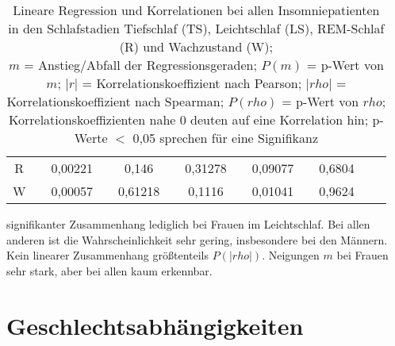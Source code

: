 \begin{table}[H]
\begin{tabularx}{0.85\textwidth}{ccccccccccccc}
R & & 0,00221 & & 0,146 & & 0,31278 & & 0,09077 & & 0,6804\\
W & & 0,00057 & & 0,61218 & & 0,1116 & & 0,01041 & & 0,9624\\
\bottomrule
\end{tabularx}
\caption[Lineare Regression und Korrelationen bei allen Insomniepatienten]{Lineare Regression und Korrelationen bei allen Insomniepatienten in den Schlafstadien Tiefschlaf (TS), Leichtschlaf (LS), \acs{REM}-Schlaf (R) und Wachzustand (W);\\
$m$ = Anstieg/Abfall der Regressionsgeraden; $P(m)$ = p-Wert von $m$; $|r|$ = Korrelationskoeffizient nach Pearson; $|rho|$ = Korrelationskoeffizient nach Spearman; $P(rho)$ = p-Wert von $rho$;\\Korrelationskoeffizienten nahe 0 deuten auf eine Korrelation hin; p-Werte $<$ 0,05 sprechen für eine Signifikanz}
\label{tab:linregAlle}
\end{table}

signifikanter Zusammenhang lediglich bei Frauen im Leichtschlaf. Bei allen anderen ist die Wahrscheinlichkeit sehr gering, insbesondere bei den Männern. Kein linearer Zusammenhang größtenteils $P(|rho|)$. Neigungen $m$ bei Frauen sehr stark, aber bei allen kaum erkennbar.







\section{Geschlechtsabhängigkeiten}


